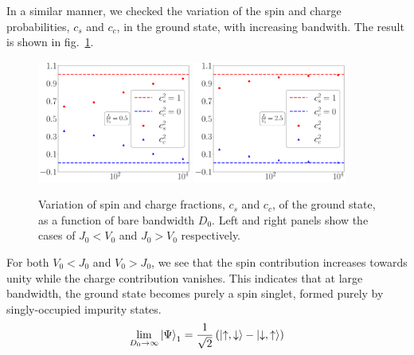 \documentclass{report}
\numberwithin{equation}{section}
\begin{document}
In a similar manner, we checked the variation of the spin and charge probabilities, \(c_s\) and \(c_c\), in the ground state, with increasing bandwith. The result is shown in fig.~\ref{c_vs_D}.
\begin{figure}[htpb]
	\centering
	\includegraphics[width=0.45\textwidth]{../figures/coeffs_vs_D_largeV.pdf}
	\includegraphics[width=0.45\textwidth]{../figures/coeffs_vs_D_smallV.pdf}
	\caption{Variation of spin and charge fractions, \(c_s\) and \(c_c\), of the ground state, as a function of bare bandwidth \(D_0\). Left and right panels show the cases of \(J_0 < V_0\) and \(J_0 > V_0\) respectively.}
	\label{c_vs_D}
\end{figure}
For both \(V_0 < J_0\) and \(V_0 > J_0\), we see that the spin contribution increases towards unity while the charge contribution vanishes. This indicates that at large bandwidth, the ground state becomes purely a spin singlet, formed purely by singly-occupied impurity states.
\begin{equation}\begin{aligned}
	\label{gstate_kondo}
	\lim_{D_0 \to \infty} \ket{\Psi}_1 = \frac{1}{\sqrt 2}\left(\ket{\uparrow, \downarrow} - \ket{\downarrow, \uparrow}\right) 
\end{aligned}\end{equation}
\end{document}
